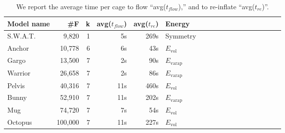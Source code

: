 \begin{table}
\centering
{}
\setlength{\tabcolsep}{5.5pt}
\begin{tabular}{l r r r r l r r r r r r r r r r r r}
\rowcolor{white}
Model name  & \#F & k & avg($t_{flow}$) & avg($t_{re}$) & Energy\\
\midrule
S.W.A.T. & 9,820 & 1 & 5s & 269s & Symmetry \\
Anchor & 10,778 & 6 & 6s & 43s & $E_\text{vol}$ \\
Gargo & 13,500 & 7 & 2s & 90s & $E_\text{varap}$\\
Warrior & 26,658 & 7 & 2s & 86s & $E_\text{varap}$  \\
Pelvis & 40,316 & 7 & 11s & 460s & $E_\text{vol}$  \\
Bunny & 52,910 & 7 & 11s & 202s & $E_\text{varap}$ \\
Mug & 74,720 & 7 & 7s & 54s & $E_\text{vol}$ \\
Octopus & 100,000 & 7 & 11s & 227s & $E_\text{vol}$ \\
\bottomrule
\end{tabular}
\caption{
We report the average time per cage to flow ``avg($t_{flow}$),'' and to
re-inflate ``avg($t_{re}$)''.}
\label{tab:timings}
\end{table}
